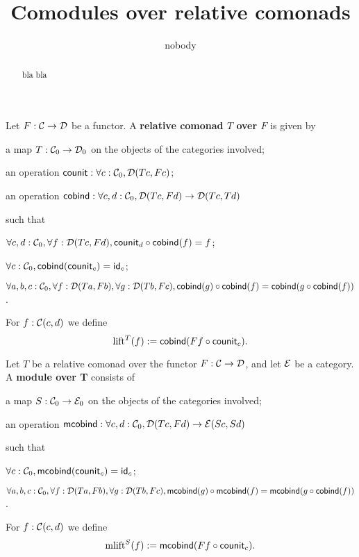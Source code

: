 \documentclass{amsart}
\author{nobody}
\title{Comodules over relative comonads}
\newcommand{\fat}[1]{\textbf{#1}}
\begin{document}
\begin{abstract}
  bla bla
\end{abstract}

\maketitle



\begin{definition}
  Let $F:\C\to\D$ be a functor. A \fat{relative comonad $T$ over $F$} is given by
  \begin{packitem}
   \item a map $T:\C_0 \to \D_0$ on the objects of the categories involved;
   \item an operation $\counit : \forall c : \C_0, \D(Tc,Fc)$;
   \item an operation $\cobind: \forall c,d:\C_0, \D(Tc,Fd) \to \D(Tc,Td)$
  \end{packitem}
  such that 
  \begin{packitem}
   \item $\forall c,d:\C_0, \forall f:\D(Tc,Fd), \comp{\cobind(f)}{\counit_d} = f$;
   \item $\forall c : \C_0, \cobind(\counit_c) = \id_c$;
   \item $\forall a,b,c:\C_0, \forall f : \D(Ta,Fb),\forall g:\D(Tb,Fc), \\
        \comp{\cobind(f)}{\cobind(g)} = \cobind(\comp{\cobind(f)}{g})$.
  \end{packitem}

 
\end{definition}

\begin{definition}
 For $f : \C(c,d)$ we define
  \[ \lift^T(f) := \cobind(\comp{\counit_c}{Ff}) .  \]
\end{definition}

\begin{definition}
 Let $T$ be a relative comonad over the functor $F:\C\to\D$, and let $\E$ be a category.
 A \fat{module over T} consists of
   \begin{packitem}
   \item a map $S:\C_0 \to \E_0$ on the objects of the categories involved;
   \item an operation $\mcobind: \forall c,d:\C_0, \D(Tc,Fd) \to \E(Sc,Sd)$
  \end{packitem}
  such that 
  \begin{packitem}
   \item $\forall c : \C_0, \mcobind(\counit_c) = \id_c$;
   \item $\forall a,b,c:\C_0, \forall f : \D(Ta,Fb),\forall g:\D(Tb,Fc), \\
        \comp{\mcobind(f)}{\mcobind(g)} = \mcobind(\comp{\cobind(f)}{g})$ .
  \end{packitem}

\end{definition}


\begin{definition}
For $f : \C(c,d)$ we define
  \[ \mlift^S(f) := \mcobind(\comp{\counit_c}{Ff}) .  \]
\end{definition}





\end{document}

